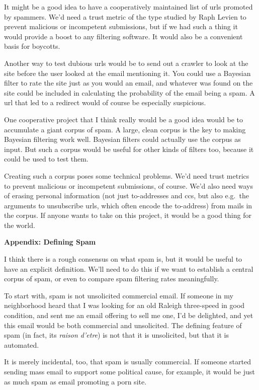 It might be a good idea to have a cooperatively maintained list of urls
promoted by spammers. We'd need a trust metric of the type studied by
Raph Levien to prevent malicious or incompetent submissions, but if we
had such a thing it would provide a boost to any filtering software. It
would also be a convenient basis for boycotts.

Another way to test dubious urls would be to send out a crawler to look
at the site before the user looked at the email mentioning it. You could
use a Bayesian filter to rate the site just as you would an email, and
whatever was found on the site could be included in calculating the
probability of the email being a spam. A url that led to a redirect
would of course be especially suspicious.

One cooperative project that I think really would be a good idea would
be to accumulate a giant corpus of spam. A large, clean corpus is the
key to making Bayesian filtering work well. Bayesian filters could
actually use the corpus as input. But such a corpus would be useful for
other kinds of filters too, because it could be used to test them.

Creating such a corpus poses some technical problems. We'd need trust
metrics to prevent malicious or incompetent submissions, of course. We'd
also need ways of erasing personal information (not just to-addresses
and ccs, but also e.g.~the arguments to unsubscribe urls, which often
encode the to-address) from mails in the corpus. If anyone wants to take
on this project, it would be a good thing for the world.

\textbf{Appendix: Defining Spam}

I think there is a rough consensus on what spam is, but it would be
useful to have an explicit definition. We'll need to do this if we want
to establish a central corpus of spam, or even to compare spam filtering
rates meaningfully.

To start with, spam is not unsolicited commercial email. If someone in
my neighborhood heard that I was looking for an old Raleigh three-speed
in good condition, and sent me an email offering to sell me one, I'd be
delighted, and yet this email would be both commercial and unsolicited.
The defining feature of spam (in fact, its \emph{raison d'etre}) is not
that it is unsolicited, but that it is automated.

It is merely incidental, too, that spam is usually commercial. If
someone started sending mass email to support some political cause, for
example, it would be just as much spam as email promoting a porn site.

